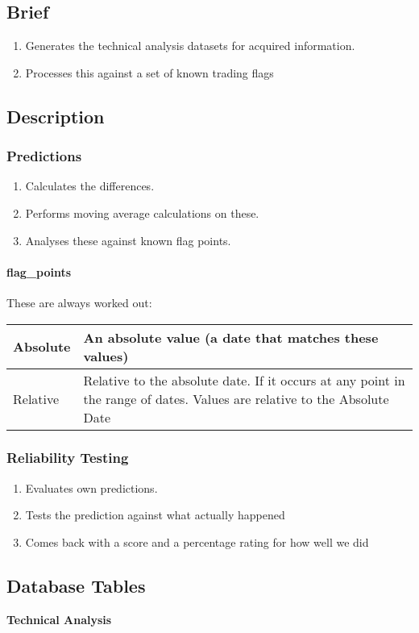 \subsection{Brief}
\begin{enumerate}
	\item Generates the technical analysis datasets for acquired information.
	\item Processes this against a set of known trading flags
\end{enumerate}
\subsection{Description}
\subsubsection{Predictions}
\begin{enumerate}
	\item Calculates the differences.
	\item Performs moving average calculations on these.
	\item Analyses these against known flag points.
\end{enumerate}
\paragraph{flag\_points}
These are always worked out: \newline
\begin{tabular}{|l||l|}
	\hline
	Absolute 				& An absolute value (a date that matches these values) \\ \hline
	Relative 				& Relative to the absolute date. If it occurs at any point in the range of dates. Values are relative to the Absolute Date \\ \hline
\end{tabular}
\subsubsection{Reliability Testing}
\begin{enumerate}
	\item Evaluates own predictions.
	\item Tests the prediction against what actually happened
	\item Comes back with a score and a percentage rating for how well we did
\end{enumerate}
\subsection{Database Tables}
\par \textbf{Technical Analysis}
